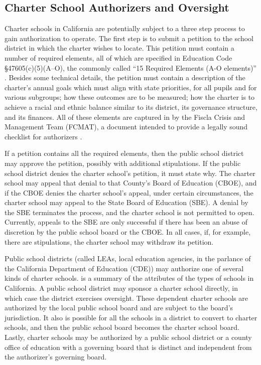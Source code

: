 \subsection{Charter School Authorizers and Oversight}\indent

Charter schools in California are potentially subject to a three step process to gain authorization to operate. The first step is to submit a petition to the school district in which the charter wishes to locate. This petition must contain a number of required elements, all of which are specified in Education Code §47605(c)(5)(A–O), the commonly called ``15 Required Elements (A-O elements)'' \parencite[89]{Aguinaldo.etal2021}. Besides some technical details, the petition must contain a description of the charter's annual goals which must align with state priorities, for all pupils and for various subgroups; how these outcomes are to be measured; how the charter is to achieve a racial and ethnic balance similar to its district, its governance structure, and its finances. All of these elements are captured in \textit{} by the Fiscla Crisis and Management Team (FCMAT), a document intended to provide a legally sound checklist for authorizers \parencite{FCMAT2022}.  %

If a petition contains all the required elements, then the public school district may approve the petition, possibly with additional stipulations. If the public school district denies the charter school's petition, it must state why. The charter school may appeal that denial to that County's Board of Education (CBOE), and if the CBOE denies the charter school's appeal, under certain circumstances, the charter school may appeal to the State Board of Education (SBE). A denial by the SBE terminates the process, and the charter school is not permitted to open. Currently, appeals to the SBE are only successful if there has been an abuse of discretion by the public school board or the CBOE. In all cases, if, for example, there are stipulations, the charter school may withdraw its petition.

Public school districts (called LEAs, local education agencies, in the parlance of the California Department of Education (CDE)) may authorize one of several kinds of charter schools.  is a summary of the attributes of the types of schools in California. A public school district may sponsor a charter school directly, in which case the district exercises oversight. These dependent charter schools are authorized by the local public school board and are subject to the board's jurisdiction. It also is possible for all the schools in a district to convert to charter schools, and then the public school board becomes the charter school board. Lastly, charter schools may be authorized by a public school district or a county office of education with a governing board that is distinct and independent from the authorizer's governing board. 

